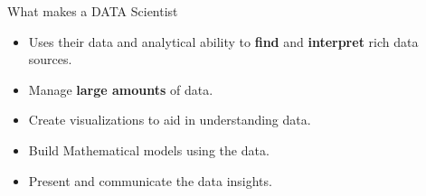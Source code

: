 \documentclass{beamer}
\begin{document}
\begin{frame}{What makes a DATA Scientist}
  \begin{itemize}
    \item Uses their data and \alert{analytical} ability to \textbf{find} and \textbf{interpret} rich data sources.\\\pause
    \item Manage \textbf{large amounts} of data.\\\pause
    \item \alert{Create} visualizations to aid in understanding data.\\\pause
    \item \alert{Build Mathematical} models using the data.\\\pause
    \item \alert{Present and communicate} the data insights.
  \end{itemize}
\end{frame}
\end{document}
